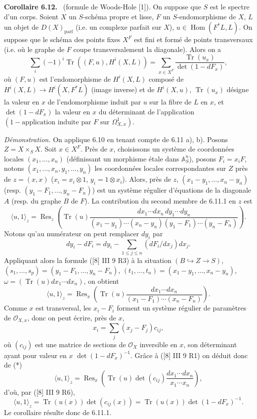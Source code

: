 \documentclass[11pt]{article}
\newenvironment{statement}[1]{\par\medskip\noindent\textbf{#1.}\ }{\par\medskip}
\DeclareMathOperator{\Hom}{Hom}
\providecommand{\OO}{\mathcal{O}}
\providecommand{\parf}{\mathrm{parf}}
\providecommand{\Hom}{\operatorname{Hom}}
\providecommand{\parf}{\mathrm{parf}}
\begin{document}
\begin{statement}{Corollaire 6.12}
(formule de Woods-Hole [1]). On suppose que $S$ est le spectre d'un corps. Soient $X$ un $S$-schéma propre et lisse, $F$ un $S$-endomorphisme de $X$, $L$ un objet de $D(X)_{\parf}$ (i.e. un complexe parfait sur $X$), $u\in\Hom(F^*L,L)$. On suppose que le schéma des points fixes $X^F$ est fini et formé de points transversaux (i.e. où le graphe de $F$ coupe transversalement la diagonale). Alors on a
\[
\sum_i(-1)^i\operatorname{Tr}((F,u),H^i(X,L))=
\sum_{x\in X^F}\frac{\operatorname{Tr}(u_x)}{\det(1-dF_x)},
\]
où $(F,u)$ est l'endomorphisme de $H^i(X,L)$ composé de $H^i(X,L)\to H^i(X,F^*L)$ (image inverse) et de $H^i(X,u)$, $\operatorname{Tr}(u_x)$ désigne la valeur en $x$ de l'endomorphisme induit par $u$ sur la fibre de $L$ en $x$, et $\det(1-dF_x)$ la valeur en $x$ du déterminant de l'application $(1-\text{application induite par }F\text{ sur }\Omega^1_{X,x})$.

\emph{Démonstration.} On applique 6.10 en tenant compte de 6.11 a), b). Posons $Z=X\times_S X$. Soit $x\in X^F$. Près de $x$, choisissons un système de coordonnées locales $(x_1,\ldots,x_n)$ (définissant un morphisme étale dans $\mathbb A_S^n$), posons $F_i=x_iF$, notons $(x_1,\ldots,x_n,y_1,\ldots,y_n)$ les coordonnées locales correspondantes sur $Z$ près de $z=(x,x)$ ($x_i=x_i\otimes1$, $y_i=1\otimes x_i$). Alors, près de $z$, $(x_1-y_1,\ldots,x_n-y_n)$ (resp. $(y_1-F_1,\ldots,y_n-F_n)$) est un système régulier d'équations de la diagonale $A$ (resp. du graphe $B$ de $F$). La contribution du second membre de 6.11.1 en $z$ est
\[
\langle u,1\rangle_z=
\operatorname{Res}_z\left(\operatorname{Tr}(u)\frac{dx_1\cdots dx_n\,dy_1\cdots dy_n}{(x_1-y_1)\cdots(x_n-y_n)(y_1-F_1)\cdots(y_n-F_n)}\right).
\]
Notons qu'au numérateur on peut remplacer $dy_i$ par
\[
dy_i-dF_i=dy_i-\sum_{1\le j\le n}(dF_i/dx_j)dx_j.
\]
Appliquant alors la formule ([8] III 9 R3) à la situation $(B\hookrightarrow Z\to S)$, $(s_1,\ldots,s_p)=(y_1-F_1,\ldots,y_n-F_n)$, $(t_1,\ldots,t_n)=(x_1-y_1,\ldots,x_n-y_n)$, $\omega=(\operatorname{Tr}(u)dx_1\cdots dx_n)$, on obtient
\begin{equation}
\tag{*}
\langle u,1\rangle_z=
\operatorname{Res}_x\left(\operatorname{Tr}(u)\frac{dx_1\cdots dx_n}{(x_1-F_1)\cdots(x_n-F_n)}\right).
\end{equation}
Comme $x$ est transversal, les $x_i-F_i$ forment un système régulier de paramètres de $\OO_{X,x}$, donc on peut écrire, près de $x$,
\[
x_i=\sum_j(x_j-F_j)c_{ij},
\]
où $(c_{ij})$ est une matrice de sections de $\OO_X$ inversible en $x$, son déterminant ayant pour valeur en $x$ $\det(1-dF_x)^{-1}$. Grâce à ([8] III 9 R1) on déduit donc de (*)
\[
\langle u,1\rangle_z=\operatorname{Res}_x\left(\operatorname{Tr}(u)\det(c_{ij})\frac{dx_1\cdots dx_n}{x_1\cdots x_n}\right),
\]
d'où, par ([8] III 9 R6),
\[
\langle u,1\rangle_z=\operatorname{Tr}(u(x))\det(c_{ij}(x))=\operatorname{Tr}(u(x))\det(1-dF_x)^{-1}.
\]
Le corollaire résulte donc de 6.11.1.
\end{statement}
\end{document}
